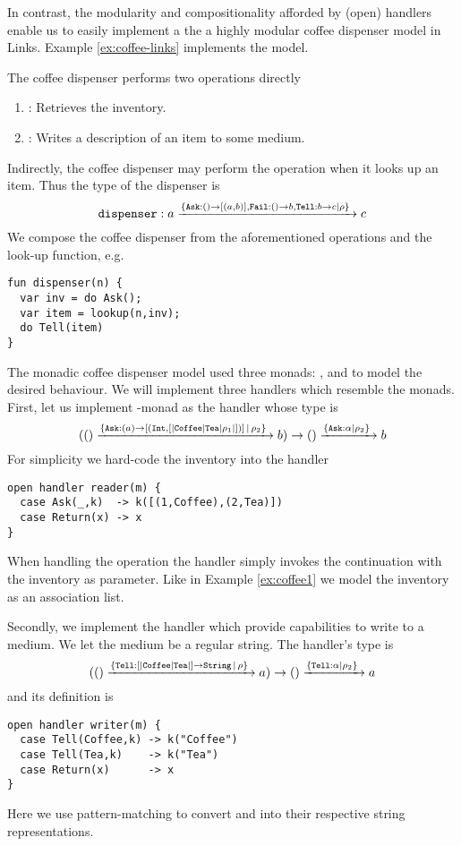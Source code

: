 In contrast, the modularity and compositionality afforded by (open) handlers enable us to easily implement a the a highly modular coffee dispenser model in Links. Example \ref{ex:coffee-links} implements the model. %
\begin{example}\label{ex:coffee-links}
The coffee dispenser performs two operations directly
\begin{enumerate}
  \item {}: Retrieves the inventory.
  \item {}: Writes a description of an item to some medium.
\end{enumerate}
Indirectly, the coffee dispenser may perform the  operation when it looks up an item. Thus the type of the dispenser is 
\[ \texttt{dispenser} : a \xrightarrow{\{\texttt{Ask}:() \to [(a, b)], \texttt{Fail}:() \to b,\texttt{Tell}:b \to c| \rho\}\;} c \]
We compose the coffee dispenser from the aforementioned operations and the look-up function, e.g.
\begin{lstlisting}[style=links]
fun dispenser(n) {
  var inv = do Ask();
  var item = lookup(n,inv);
  do Tell(item)
}
\end{lstlisting}
The monadic coffee dispenser model used three monads: ,  and  to model the desired behaviour. We will implement three handlers which resemble the monads. First, let us implement -monad as the handler  whose type is 
\[  (() \xrightarrow{\{\texttt{Ask}:(a) \to [(\texttt{Int}, [|\texttt{Coffee}|\texttt{Tea}|\rho_1|])] \, | \,\rho_2\}\;} b) \to () \xrightarrow{\{\texttt{Ask}:\alpha|\rho_2\}\;} b \]
For simplicity we hard-code the inventory into the handler
\begin{lstlisting}[style=links]
open handler reader(m) {
  case Ask(_,k)  -> k([(1,Coffee),(2,Tea)])
  case Return(x) -> x
}
\end{lstlisting}
When handling the operation  the handler simply invokes the continuation  with the inventory as parameter. Like in Example \ref{ex:coffee1} we model the inventory as an association list.

Secondly, we implement the handler  which provide capabilities to write to a medium. We let the medium be a regular string. The handler's type is
\[  (() \xrightarrow{\{\texttt{Tell}: [|\texttt{Coffee}|\texttt{Tea}|] \to \texttt{String} \, | \,\rho\}\;} a) \to () \xrightarrow{\{\texttt{Tell}:\alpha|\rho_2\}\;} a \]
and its definition is
\begin{lstlisting}[style=links]
open handler writer(m) {
  case Tell(Coffee,k) -> k("Coffee")
  case Tell(Tea,k)    -> k("Tea")
  case Return(x)      -> x
}
\end{lstlisting}
Here we use pattern-matching to convert  and  into their respective string representations.


\end{example}
